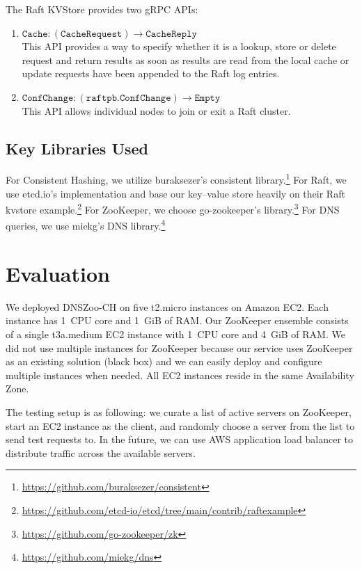 \documentclass[format=sigconf,nonacm,screen]{acmart}
\newcommand{\dnszooch}{\textsf{DNSZoo-CH}}
\begin{document}
The Raft KVStore provides two gRPC APIs:
\begin{enumerate}
    \item $\mathtt{Cache} : (\mathtt{CacheRequest})\to\mathtt{CacheReply}$\\
    This API provides a way to specify whether it is a lookup, store or delete request and return results as soon as results are read from the local cache or update requests have been appended to the Raft log entries.
    \item $\mathtt{ConfChange} : (\mathtt{raftpb.ConfChange}) \to \mathtt{Empty}$\\
    This API allows individual nodes to join or exit a Raft cluster.
\end{enumerate}

\subsection{Key Libraries Used}
For Consistent Hashing, we utilize buraksezer's consistent library.\footnote{\url{https://github.com/buraksezer/consistent}} For Raft, we use etcd.io's implementation and base our key--value store heavily on their Raft kvstore example.\footnote{\url{https://github.com/etcd-io/etcd/tree/main/contrib/raftexample}} For ZooKeeper, we choose go-zookeeper's library.\footnote{\url{https://github.com/go-zookeeper/zk}} For DNS queries, we use miekg's DNS library.\footnote{\url{https://github.com/miekg/dns}}

\section{Evaluation}
We deployed \dnszooch{} on five \textsf{t2.micro} instances on Amazon EC2. Each instance has 1~CPU core and 1~GiB of RAM. Our ZooKeeper ensemble consists of a single \textsf{t3a.medium} EC2 instance with 1~CPU core and 4~GiB of RAM. We did not use multiple instances for ZooKeeper because our service uses ZooKeeper as an existing solution (black box) and we can easily deploy and configure multiple instances when needed. All EC2 instances reside in the same Availability Zone.

The testing setup is as following: we curate a list of active servers on ZooKeeper, start an EC2 instance as the client, and randomly choose a server from the list to send test requests to. In the future, we can use AWS application load balancer to distribute traffic across the available servers.
\end{document}
